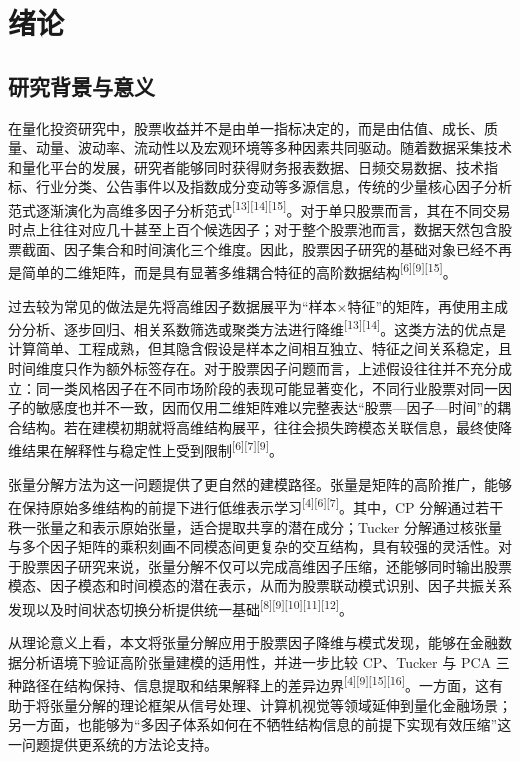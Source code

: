 \chapter{绪论}

\section{研究背景与意义}

在量化投资研究中，股票收益并不是由单一指标决定的，而是由估值、成长、质量、动量、波动率、流动性以及宏观环境等多种因素共同驱动。随着数据采集技术和量化平台的发展，研究者能够同时获得财务报表数据、日频交易数据、技术指标、行业分类、公告事件以及指数成分变动等多源信息，传统的少量核心因子分析范式逐渐演化为高维多因子分析范式\textsuperscript{[13][14][15]}。对于单只股票而言，其在不同交易时点上往往对应几十甚至上百个候选因子；对于整个股票池而言，数据天然包含股票截面、因子集合和时间演化三个维度。因此，股票因子研究的基础对象已经不再是简单的二维矩阵，而是具有显著多维耦合特征的高阶数据结构\textsuperscript{[6][9][15]}。

过去较为常见的做法是先将高维因子数据展平为“样本$\times$特征”的矩阵，再使用主成分分析、逐步回归、相关系数筛选或聚类方法进行降维\textsuperscript{[13][14]}。这类方法的优点是计算简单、工程成熟，但其隐含假设是样本之间相互独立、特征之间关系稳定，且时间维度只作为额外标签存在。对于股票因子问题而言，上述假设往往并不充分成立：同一类风格因子在不同市场阶段的表现可能显著变化，不同行业股票对同一因子的敏感度也并不一致，因而仅用二维矩阵难以完整表达“股票—因子—时间”的耦合结构。若在建模初期就将高维结构展平，往往会损失跨模态关联信息，最终使降维结果在解释性与稳定性上受到限制\textsuperscript{[6][7][9]}。

张量分解方法为这一问题提供了更自然的建模路径。张量是矩阵的高阶推广，能够在保持原始多维结构的前提下进行低维表示学习\textsuperscript{[4][6][7]}。其中，CP 分解通过若干秩一张量之和表示原始张量，适合提取共享的潜在成分；Tucker 分解通过核张量与多个因子矩阵的乘积刻画不同模态间更复杂的交互结构，具有较强的灵活性。对于股票因子研究来说，张量分解不仅可以完成高维因子压缩，还能够同时输出股票模态、因子模态和时间模态的潜在表示，从而为股票联动模式识别、因子共振关系发现以及时间状态切换分析提供统一基础\textsuperscript{[8][9][10][11][12]}。

从理论意义上看，本文将张量分解应用于股票因子降维与模式发现，能够在金融数据分析语境下验证高阶张量建模的适用性，并进一步比较 CP、Tucker 与 PCA 三种路径在结构保持、信息提取和结果解释上的差异边界\textsuperscript{[4][9][15][16]}。一方面，这有助于将张量分解的理论框架从信号处理、计算机视觉等领域延伸到量化金融场景；另一方面，也能够为“多因子体系如何在不牺牲结构信息的前提下实现有效压缩”这一问题提供更系统的方法论支持。

